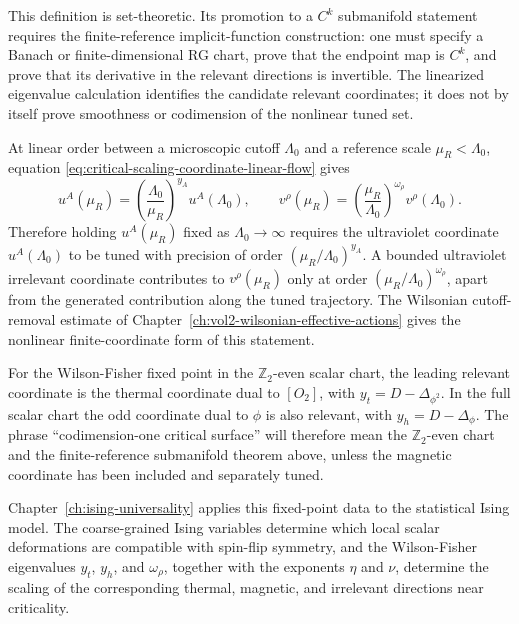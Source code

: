 This definition is set-theoretic.  Its promotion to a \(C^k\) submanifold
statement requires the finite-reference implicit-function construction: one
must specify a Banach or finite-dimensional RG chart, prove that the endpoint
map is \(C^k\), and prove that its derivative in the relevant directions is
invertible.  The linearized eigenvalue calculation identifies the candidate
relevant coordinates; it does not by itself prove smoothness or codimension of
the nonlinear tuned set.

At linear order between a microscopic cutoff \(\Lambda_0\) and a reference
scale \(\mu_R<\Lambda_0\), equation
\eqref{eq:critical-scaling-coordinate-linear-flow} gives
\[
  u^A(\mu_R)
  =
  \left(\frac{\Lambda_0}{\mu_R}\right)^{y_A}
  u^A(\Lambda_0),
  \qquad
  v^\rho(\mu_R)
  =
  \left(\frac{\mu_R}{\Lambda_0}\right)^{\omega_\rho}
  v^\rho(\Lambda_0).
\]
Therefore holding \(u^A(\mu_R)\) fixed as \(\Lambda_0\to\infty\) requires
the ultraviolet coordinate \(u^A(\Lambda_0)\) to be tuned with precision of
order \((\mu_R/\Lambda_0)^{y_A}\).  A bounded ultraviolet irrelevant coordinate
contributes to \(v^\rho(\mu_R)\) only at order
\((\mu_R/\Lambda_0)^{\omega_\rho}\), apart from the generated contribution
along the tuned trajectory.  The Wilsonian cutoff-removal estimate of
Chapter~\ref{ch:vol2-wilsonian-effective-actions} gives the nonlinear
finite-coordinate form of this statement.

For the Wilson-Fisher fixed point in the \(\mathbb Z_2\)-even scalar chart,
the leading relevant coordinate is the thermal coordinate dual to
\([O_2]\), with \(y_t=D-\Delta_{\phi^2}\).  In the full scalar chart the odd
coordinate dual to \(\phi\) is also relevant, with
\(y_h=D-\Delta_\phi\).  The phrase ``codimension-one critical surface'' will
therefore mean the \(\mathbb Z_2\)-even chart and the finite-reference
submanifold theorem above, unless the magnetic coordinate has been included
and separately tuned.

Chapter~\ref{ch:ising-universality} applies this fixed-point data to the
statistical Ising model.  The coarse-grained Ising variables determine which
local scalar deformations are compatible with spin-flip symmetry, and the
Wilson-Fisher eigenvalues \(y_t\), \(y_h\), and \(\omega_\rho\), together with
the exponents \(\eta\) and \(\nu\), determine the scaling of the corresponding
thermal, magnetic, and irrelevant directions near criticality.
